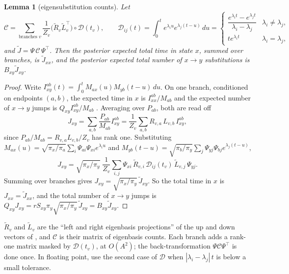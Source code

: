 \documentclass[11pt]{article}
\newtheorem{lemma}{Lemma}
\begin{document}
\begin{lemma}[eigensubstitution counts]\label{lem:hr}
Let
\[
\mathcal C=\sum_{\text{branches }v}\frac{1}{Z_v}
\big(\tilde R_v\tilde L_v^\top\big)\circ\mathcal D(t_v),
\qquad
\mathcal D_{ij}(t)=\int_0^te^{\lambda_iu}e^{\lambda_j(t-u)}\,du
=\begin{cases}\dfrac{e^{\lambda_it}-e^{\lambda_jt}}{\lambda_i-\lambda_j}&\lambda_i\ne\lambda_j,\\[6pt]
te^{\lambda_it}&\lambda_i=\lambda_j,\end{cases}
\]
and $\tilde J=\Psi\,\mathcal C\,\Psi^\top$. Then the posterior expected total time
in state $x$, summed over branches, is $\tilde J_{xx}$, and the posterior
expected total number of $x\to y$ substitutions is $B_{xy}\tilde J_{xy}$.
\end{lemma}
\begin{proof}
Write $I^{ab}_{xy}(t)=\int_0^tM_{ax}(u)M_{yb}(t-u)\,du$. On one branch,
conditioned on endpoints $(a,b)$, the expected time in $x$ is
$I^{ab}_{xx}/M_{ab}$ and the expected number of $x\to y$ jumps is
$Q_{xy}I^{ab}_{xy}/M_{ab}$ \citep{HolmesRubin2002,HobolthJensen2005}.
Averaging over $P_{ab}$, both are read off
\[
J_{xy}=\sum_{a,b}\frac{P_{ab}}{M_{ab}}I^{ab}_{xy}
=\frac1{Z_v}\sum_{a,b}R_{v,a}\,L_{v,b}\,I^{ab}_{xy},
\]
since $P_{ab}/M_{ab}=R_{v,a}L_{v,b}/Z_v$ has rank one. Substituting
$M_{ax}(u)=\sqrt{\pi_x/\pi_a}\sum_i\Psi_{ai}\Psi_{xi}e^{\lambda_iu}$ and
$M_{yb}(t-u)=\sqrt{\pi_b/\pi_y}\sum_j\Psi_{yj}\Psi_{bj}e^{\lambda_j(t-u)}$,
\[
J_{xy}=\sqrt{\pi_x/\pi_y}\;\frac1{Z_v}\sum_{i,j}\Psi_{xi}\,\tilde R_{v,i}\,
\mathcal D_{ij}(t_v)\,\tilde L_{v,j}\,\Psi_{yj}.
\]
Summing over branches gives $J_{xy}=\sqrt{\pi_x/\pi_y}\,\tilde J_{xy}$. So the
total time in $x$ is $J_{xx}=\tilde J_{xx}$, and the total number of $x\to y$
jumps is $Q_{xy}J_{xy}=rS_{xy}\pi_y\sqrt{\pi_x/\pi_y}\,\tilde J_{xy}
=B_{xy}\tilde J_{xy}$.
\end{proof}

$\tilde R_v$ and $\tilde L_v$ are the ``left and right eigenbasis projections''
of the up and down vectors of \citet{HolmesRubin2002}, and $\mathcal C$ is
their matrix of eigenbasis counts. Each branch adds a rank-one matrix masked
by $\mathcal D(t_v)$, at $O(A^2)$; the back-transformation $\Psi\mathcal C\Psi^\top$
is done once. In floating point, use the second case of $\mathcal D$ when
$|\lambda_i-\lambda_j|\,t$ is below a small tolerance.
\end{document}
